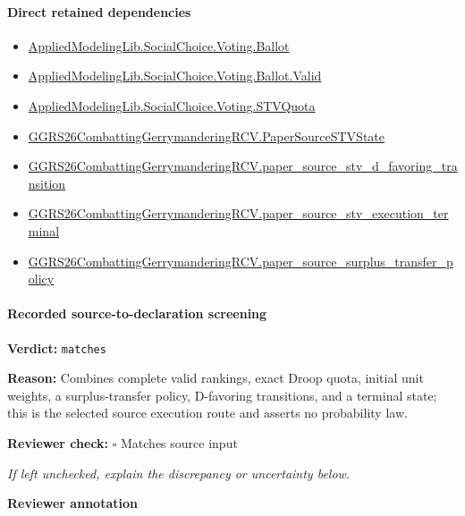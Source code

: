 \documentclass[10pt]{article}
\newcommand{\reviewerbox}{%
  \par\noindent\fbox{\parbox{0.96\linewidth}{\rule{0pt}{0.38in}}}\par
}
\newcommand{\reviewmatch}[1]{%
  \par\noindent\textbf{Reviewer check:} $\square$\; #1\par
  \noindent\emph{If left unchecked, explain the discrepancy or uncertainty below.}\par
}
\begin{document}
\paragraph{Direct retained dependencies}
\begin{itemize}\raggedright
\item \hyperlink{governing-declaration-4c0320b08e4fb484}{Applied\allowbreak{}Modeling\allowbreak{}Lib.\allowbreak{}Social\allowbreak{}Choice.\allowbreak{}Voting.\allowbreak{}Ballot}
\item \hyperlink{governing-declaration-d09ca390012680b9}{Applied\allowbreak{}Modeling\allowbreak{}Lib.\allowbreak{}Social\allowbreak{}Choice.\allowbreak{}Voting.\allowbreak{}Ballot.\allowbreak{}Valid}
\item \hyperlink{governing-declaration-d335879a7207e841}{Applied\allowbreak{}Modeling\allowbreak{}Lib.\allowbreak{}Social\allowbreak{}Choice.\allowbreak{}Voting.\allowbreak{}STV\allowbreak{}Quota}
\item \hyperlink{paper-prerequisite-9acd2440ce1052db}{GGRS26\allowbreak{}Combatting\allowbreak{}Gerrymandering\allowbreak{}RCV.\allowbreak{}Paper\allowbreak{}Source\allowbreak{}STV\allowbreak{}State}
\item \hyperlink{paper-prerequisite-01a70a9b3aa00da3}{GGRS26\allowbreak{}Combatting\allowbreak{}Gerrymandering\allowbreak{}RCV.\allowbreak{}paper\_\allowbreak{}source\_\allowbreak{}stv\_\allowbreak{}d\_\allowbreak{}favoring\_\allowbreak{}transition}
\item \hyperlink{paper-prerequisite-42c2df760fca2c30}{GGRS26\allowbreak{}Combatting\allowbreak{}Gerrymandering\allowbreak{}RCV.\allowbreak{}paper\_\allowbreak{}source\_\allowbreak{}stv\_\allowbreak{}execution\_\allowbreak{}terminal}
\item \hyperlink{paper-prerequisite-abed5fd2c2d17fba}{GGRS26\allowbreak{}Combatting\allowbreak{}Gerrymandering\allowbreak{}RCV.\allowbreak{}paper\_\allowbreak{}source\_\allowbreak{}surplus\_\allowbreak{}transfer\_\allowbreak{}policy}
\end{itemize}
\paragraph{Recorded source-to-declaration screening}
\textbf{Verdict:} \texttt{matches}
\\
{\raggedright
\textbf{Reason:} Combines complete valid rankings, exact Droop quota, initial unit weights, a surplus-\allowbreak{}transfer policy, D-\allowbreak{}favoring transitions, and a terminal state;\allowbreak{} this is the selected source execution route and asserts no probability law.\allowbreak{}
\par}
\reviewmatch{Matches source input}
\noindent\textbf{Reviewer annotation}\par
\reviewerbox
\clearpage
\hypertarget{paper-prerequisite-f7db6c9d33a2a094}{}
\end{document}
